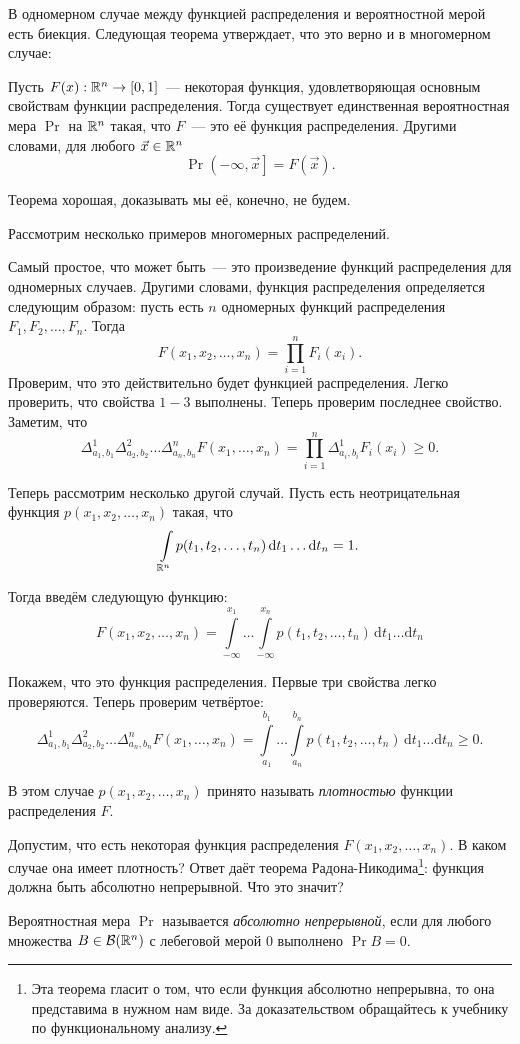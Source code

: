 В одномерном случае между функцией распределения и вероятностной мерой есть биекция. Следующая теорема утверждает, что это верно и в многомерном случае:
\begin{theorem}
	Пусть \(F(x): \mathbb{R}^{n} \to [0, 1]\)~--- некоторая функция, удовлетворяющая основным свойствам функции распределения. Тогда существует единственная вероятностная мера \(\Pr\) на \(\mathbb{R}^{n}\) такая, что \(F\)~--- это её функция распределения. Другими словами, для любого \(\vec{x} \in \mathbb{R}^{n}\)
	\[
	\Pr{\left(-\infty, \vec{x}\right]} = F(\vec{x}).
	\]
\end{theorem}
Теорема хорошая, доказывать мы её, конечно, не будем.

Рассмотрим несколько примеров многомерных распределений.

Самый простое, что может быть~--- это произведение функций распределения для одномерных случаев. Другими словами, функция распределения определяется следующим образом: пусть есть \(n\) одномерных функций распределения \(F_1, F_2, \dots, F_n\). Тогда
\[
F(x_1, x_2, \dots, x_n) = \prod\limits_{i = 1}^{n} F_i(x_i).
\]
Проверим, что это действительно будет функцией распределения. Легко проверить, что свойства \(1-3\) выполнены. Теперь проверим последнее свойство. Заметим, что
\[
\Delta_{a_1, b_1}^{1} \Delta_{a_2, b_2}^{2} \dots \Delta_{a_n, b_n}^{n} F(x_1, \dots, x_n) = \prod\limits_{i = 1}^{n} \Delta_{a_i, b_i}^{1}F_i(x_i) \geq 0.
\]

Теперь рассмотрим несколько другой случай. Пусть есть неотрицательная функция \(p(x_1, x_2, \dots, x_n)\) такая, что
\[
\int\limits_{\mathbb{R}^{n}} p(t_1, t_2, \dots, t_n)\,\mathrm{d}t_1\dots\mathrm{d}t_n = 1.
\]

Тогда введём следующую функцию:
\[
F(x_1, x_2, \dots, x_n) = \int\limits_{-\infty}^{x_1} \dots \int\limits_{-\infty}^{x_n} p(t_1, t_2, \dots, t_n)\,\mathrm{d}t_1\dots\mathrm{d}t_n
\]

Покажем, что это функция распределения. Первые три свойства легко проверяются. Теперь проверим четвёртое:
\[
\Delta_{a_1, b_1}^{1} \Delta_{a_2, b_2}^{2} \dots \Delta_{a_n, b_n}^{n} F(x_1, \dots, x_n) = \int\limits_{a_1}^{b_1} \dots \int\limits_{a_n}^{b_n} p(t_1, t_2, \dots, t_n)\,\mathrm{d}t_1\dots\mathrm{d}t_n \geq 0.
\]

В этом случае \(p(x_1, x_2, \dots, x_n)\) принято называть \emph{плотностью} функции распределения \(F\).

Допустим, что есть некоторая функция распределения \(F(x_1, x_2, \dots, x_n)\). В каком случае она имеет плотность? Ответ даёт теорема Радона-Никодима\footnote{Эта теорема гласит о том, что если функция абсолютно непрерывна, то она представима в нужном нам виде. За доказательством обращайтесь к учебнику по функциональному анализу.}: функция должна быть абсолютно непрерывной. Что это значит?
\begin{definition}
	Вероятностная мера \(\Pr\) называется \emph{абсолютно непрерывной}, если для любого множества \(B \in \mathcal{B}(\mathbb{R}^n)\) с лебеговой мерой 0 выполнено \(\Pr{B} = 0\).
\end{definition}

